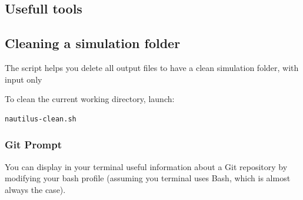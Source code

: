 \documentclass[english,a4paper,twoside]{article}
\begin{document}
\subsection{Usefull tools}
\subsection{Cleaning a simulation folder}
The script  helps you delete all output files to have a clean simulation folder, with input only

To clean the current working directory, launch:
\begin{verbatim}
nautilus-clean.sh
\end{verbatim}

\subsubsection{Git Prompt}
You can display in your terminal useful information about a Git repository by modifying your bash profile (assuming you terminal uses Bash, which is almost always the case).
\end{document}
